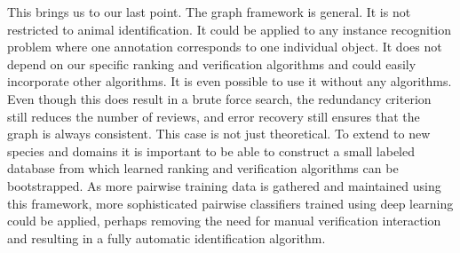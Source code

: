 This brings us to our last point.
The graph framework is general.
It is not restricted to animal identification.
It could be applied to any instance recognition problem where one annotation corresponds to one individual
  object.
It does not depend on our specific ranking and verification algorithms and could easily incorporate other
  algorithms.
It is even possible to use it without any algorithms.
Even though this does result in a brute force search, the redundancy criterion still reduces the number of
  reviews, and error recovery still ensures that the graph is always consistent.
This case is not just theoretical.
To extend to new species and domains it is important to be able to construct a small labeled database from which
  learned ranking and verification algorithms can be bootstrapped.
As more pairwise training data is gathered and maintained using this framework, more sophisticated pairwise
  classifiers trained using deep learning could be applied, perhaps removing the need for manual verification
  interaction and resulting in a fully automatic identification algorithm.

